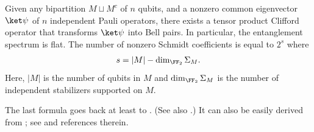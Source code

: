 \begin{thm}
Given any bipartition $M \sqcup M^c$ of $n$ qubits,
and a nonzero common eigenvector $\ket \psi$ of $n$
independent Pauli operators,
there exists a tensor product Clifford operator
that transforms $\ket \psi$ into Bell pairs.
In particular, the entanglement spectrum is flat.
The number of nonzero Schmidt coefficients is equal to $2^s$
where
\begin{align}
 s = |M| - \dim_{\FF_2} \Sigma_M .
\label{eq:entropy}
\end{align}
Here, $|M|$ is the number of qubits in $M$ and
$\dim_{\FF_2} \Sigma_M$ is the number of independent stabilizers supported on $M$.
\label{EntanglementSpectrum}
\end{thm}
The last formula goes back at least to \cite{FattalCubittYamamotoEtAl2004Entanglement}.
(See also \cite{HammaIonicioiuZanardi2005}.)
It can also be easily derived from \cite{KlappeneckerRoetteler2002stabilizer};
see \cite{LindenMatusRuskaiEtAl2013Quantum} and references therein.
